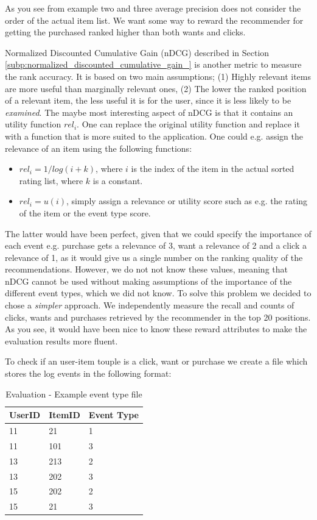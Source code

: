 As you see from example two and three average precision does not consider the order of the actual item list. We want some way to
reward the recommender for getting the purchased ranked higher than both wants and clicks.

Normalized Discounted Cumulative Gain (nDCG) described in Section \ref{subp:normalized_discounted_cumulative_gain_} is another metric to
measure the rank accuracy. It is based on two main assumptions; (1) Highly relevant items are more useful than marginally relevant ones,
(2) The lower the ranked position of a relevant item, the less useful it is for the user, since it is less likely to be \emph{examined}.
The maybe most interesting aspect of nDCG is that it contains an utility function $rel_i$. One can replace the original utility function
and replace it with a function that is more suited to the application. One could e.g. assign the relevance of an item using
the following functions:

\begin{itemize}
\item $rel_i = 1/log(i+k)$, where $i$ is the index of the item in the actual sorted rating list, where $k$ is a constant.
\item $rel_i = u(i)$, simply assign a relevance or utility score such as e.g. the rating of the item or the event type score.
\end{itemize}

The latter would have been perfect, given that we could specify the importance of each event e.g. purchase gets a relevance of 3, want
a relevance of 2 and a click a relevance of 1, as it would give us a single number on the ranking quality of the recommendations.
However, we do not not know these values, meaning that nDCG cannot be used without making assumptions of the importance of the different
event types, which we did not know. To solve this problem we decided to chose a \emph{simpler} approach. We independently measure the recall
and counts of clicks, wants and purchases retrieved by the recommender in the top 20 positions. As you see, it would have been nice to know these
reward attributes to make the evaluation results more fluent.

To check if an user-item touple is a click, want or purchase we create a file which
stores the log events in the following format:

\begin{table}[H]
\label{table:event-type}
\centering
\begin{tabular}{*{3}l}
\toprule
UserID	&	ItemID	 &  Event Type  \\ \midrule
11		&	21		 &	1			\\
11		&	101		 &	3			\\
13		&	213		 &	2			\\
13		&	202		 &  3			\\
15		&	202		 &  2			\\
15		&	21		 &  3			\\
\bottomrule
\end{tabular}
\caption{Evaluation - Example event type file}
\end{table}

